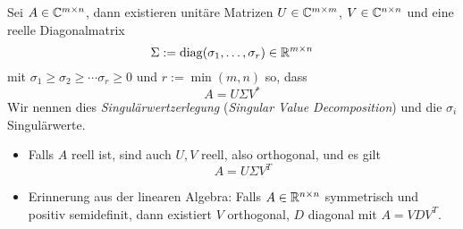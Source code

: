 \documentclass[
]{mycourse}
\begin{document}
\begin{st}
	\label{1.37}
	Sei $A\in \mathbb{C}^{m\times n}$, dann existieren unitäre Matrizen $U\in \mathbb{C}^{m\times m}$, $V\in \mathbb{C}^{n\times n}$ und eine reelle Diagonalmatrix
	\[
		\Sigma := \operatorname{diag}( \sigma_1, \dotsc, \sigma_r)  \in \mathbb{R}^{m\times n}
	\]
	mit $\sigma_1\ge \sigma_2 \ge \dotsb \sigma_r \ge 0$ und $r:= \min(m,n)$ so, dass
	\[
		A = U \Sigma V^*
	\]
	Wir nennen dies \emph{Singulärwertzerlegung} (\emph{Singular Value Decomposition}) und die $\sigma_i$ Singulärwerte.
	\begin{note}
		\begin{itemize}
			\item
				Falls $A$ reell ist, sind auch $U,V$ reell, also orthogonal, und es gilt
				\[
					A=U\Sigma V^T
				\]
			\item
				Erinnerung aus der linearen Algebra:
				Falls $A \in \mathbb{R}^{n\times n}$ symmetrisch und positiv semidefinit, dann existiert $V$ orthogonal, $D$ diagonal mit $A=VDV^T$.


\end{itemize}
\end{note}
\end{st}
\end{document}
